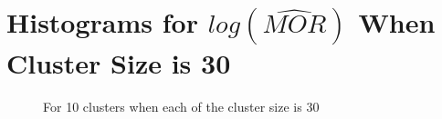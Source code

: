 \documentclass[
  letterpaper,
  DIV=11,
  numbers=noendperiod]{scrartcl}
\begin{document}
\newpage

\hypertarget{histograms-for-logwidehatmor-when-cluster-size-is-30}{%
\section{\texorpdfstring{Histograms for \(log(\widehat{MOR})\) When
Cluster Size is
30}{Histograms for log(\textbackslash widehat\{MOR\}) When Cluster Size is 30}}\label{histograms-for-logwidehatmor-when-cluster-size-is-30}}

\vspace{5mm}

\begin{figure}

\begin{minipage}[t]{0.44\linewidth}

{\centering 


\caption{For 10 clusters when each of the cluster size is 30}

}

\end{minipage}%
%
\begin{minipage}[t]{0.11\linewidth}


\end{minipage}
\end{figure}
\end{document}
